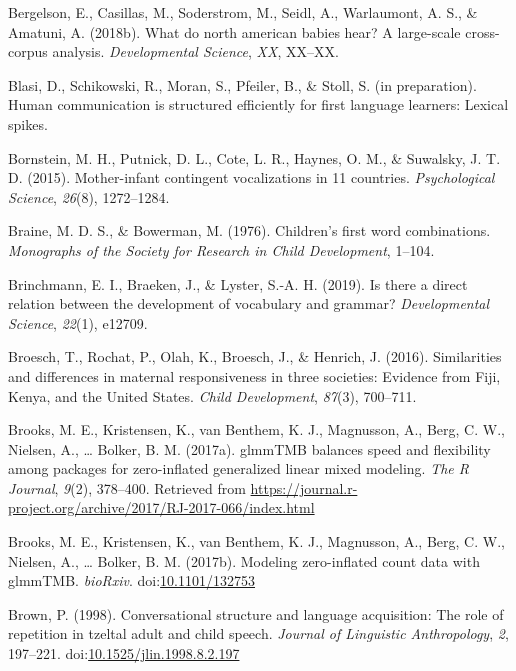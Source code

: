 \documentclass[floatsintext,man]{apa6}
\theoremstyle{definition}
\theoremstyle{definition}
\theoremstyle{definition}
\theoremstyle{remark}
\begin{document}
\hypertarget{ref-bergelsoncasillas2018what}{}
Bergelson, E., Casillas, M., Soderstrom, M., Seidl, A., Warlaumont, A.
S., \& Amatuni, A. (2018b). What do north american babies hear? A
large-scale cross-corpus analysis. \emph{Developmental Science},
\emph{XX}, XX--XX.

\hypertarget{ref-blasiIPhuman}{}
Blasi, D., Schikowski, R., Moran, S., Pfeiler, B., \& Stoll, S. (in
preparation). Human communication is structured efficiently for first
language learners: Lexical spikes.

\hypertarget{ref-bornstein2015mother}{}
Bornstein, M. H., Putnick, D. L., Cote, L. R., Haynes, O. M., \&
Suwalsky, J. T. D. (2015). Mother-infant contingent vocalizations in 11
countries. \emph{Psychological Science}, \emph{26}(8), 1272--1284.

\hypertarget{ref-braine1976childrens}{}
Braine, M. D. S., \& Bowerman, M. (1976). Children's first word
combinations. \emph{Monographs of the Society for Research in Child
Development}, 1--104.

\hypertarget{ref-brinchmann2019direct}{}
Brinchmann, E. I., Braeken, J., \& Lyster, S.-A. H. (2019). Is there a
direct relation between the development of vocabulary and grammar?
\emph{Developmental Science}, \emph{22}(1), e12709.

\hypertarget{ref-broesch2016similarities}{}
Broesch, T., Rochat, P., Olah, K., Broesch, J., \& Henrich, J. (2016).
Similarities and differences in maternal responsiveness in three
societies: Evidence from Fiji, Kenya, and the United States. \emph{Child
Development}, \emph{87}(3), 700--711.

\hypertarget{ref-R-glmmTMB}{}
Brooks, M. E., Kristensen, K., van Benthem, K. J., Magnusson, A., Berg,
C. W., Nielsen, A., \ldots{} Bolker, B. M. (2017a). glmmTMB balances
speed and flexibility among packages for zero-inflated generalized
linear mixed modeling. \emph{The R Journal}, \emph{9}(2), 378--400.
Retrieved from
\url{https://journal.r-project.org/archive/2017/RJ-2017-066/index.html}

\hypertarget{ref-brooks2017modeling}{}
Brooks, M. E., Kristensen, K., van Benthem, K. J., Magnusson, A., Berg,
C. W., Nielsen, A., \ldots{} Bolker, B. M. (2017b). Modeling
zero-inflated count data with glmmTMB. \emph{bioRxiv}.
doi:\href{https://doi.org/10.1101/132753}{10.1101/132753}

\hypertarget{ref-brown1998conversational}{}
Brown, P. (1998). Conversational structure and language acquisition: The
role of repetition in tzeltal adult and child speech. \emph{Journal of
Linguistic Anthropology}, \emph{2}, 197--221.
doi:\href{https://doi.org/10.1525/jlin.1998.8.2.197}{10.1525/jlin.1998.8.2.197}
\end{document}
